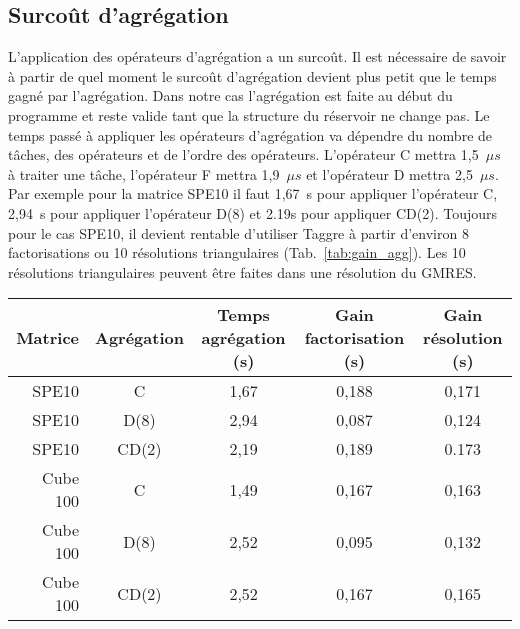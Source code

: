 \subsection{Surcoût d'agrégation}
L'application des opérateurs d'agrégation a un surcoût.
%
Il est nécessaire de savoir à partir de quel moment le surcoût d'agrégation devient plus petit que le temps gagné par l'agrégation.
%
Dans notre cas l'agrégation est faite au début du programme et reste valide tant que la structure du réservoir ne change pas.
%
Le temps passé à appliquer les opérateurs d'agrégation va dépendre du nombre de tâches, des opérateurs et de l'ordre des opérateurs.
%
L'opérateur C mettra 1,5~$\mu{s}$ à traiter une tâche, l'opérateur F mettra 1,9~$\mu{s}$ et l'opérateur D mettra 2,5~$\mu{s}$.
%
Par exemple pour la matrice SPE10 il faut 1,67~s pour appliquer l'opérateur C, 2,94~s pour appliquer l'opérateur D(8) et 2.19s pour appliquer CD(2).
%
Toujours pour le cas SPE10, il devient rentable d'utiliser Taggre à partir d'environ 8 factorisations ou 10 résolutions triangulaires (Tab.~\ref{tab:gain_agg}).
%
Les 10 résolutions triangulaires peuvent être faites dans une résolution du GMRES.
\begin{center}
  \begin{tabular}{ | r | c || c | c | c | }
    \hline
    Matrice & Agrégation & Temps agrégation (s) & Gain factorisation (s) & Gain résolution (s)\\
    \hline
    \hline
    SPE10   &      C     & 1,67          & 0,188          & 0,171 \\
    \hline
    SPE10   &    D(8)    & 2,94          & 0,087          & 0,124 \\
    \hline
    SPE10   &    CD(2)   & 2,19          & 0,189          & 0.173 \\
    \hline
    \hline
    Cube 100&      C     & 1,49          & 0,167          & 0,163 \\
    \hline
    Cube 100&    D(8)    & 2,52          & 0,095          & 0,132 \\
    \hline
    Cube 100&    CD(2)   & 2,52          & 0,167          & 0,165 \\
    \hline
  \end{tabular}
  \label{tab:gain_agg}
\end{center}
